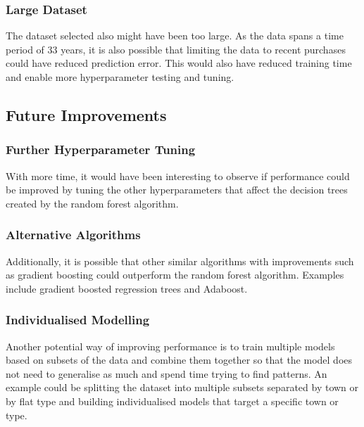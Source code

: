 \documentclass[[12pt,conference]{IEEEtran}
\begin{document}
\subsubsection{Large Dataset}
The dataset selected also might have been too large. As the data spans a time period of 33 years, it is also possible that limiting the data to recent purchases could have reduced prediction error. 
This would also have reduced training time and enable more hyperparameter testing and tuning.


\subsection{Future Improvements}

\subsubsection{Further Hyperparameter Tuning}
With more time, it would have been interesting to observe if performance could be improved by tuning the other hyperparameters that affect the decision trees created by the random forest algorithm. 

\subsubsection{Alternative Algorithms}Additionally, it is possible that other similar algorithms with improvements such as gradient boosting could outperform the random forest algorithm. Examples include gradient boosted regression trees and Adaboost.

\subsubsection{Individualised Modelling} 
Another potential way of improving performance is to train multiple models based on subsets of the data and combine them together so that the model does not need to generalise as much and spend time trying to find patterns. 
An example could be splitting the dataset into multiple subsets separated by town or by flat type and building individualised models that target a specific town or type.
\end{document}
